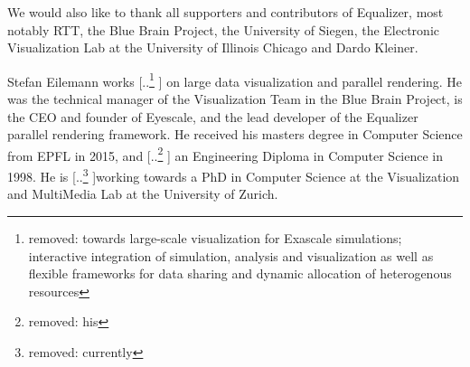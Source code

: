\documentclass[10pt,journal,compsoc]{IEEEtran}
\providecommand{\DIFaddtex}[1]{{\protect\color{blue} \sf #1}} %
\providecommand{\DIFdeltex}[1]{{\protect\color{red} [..\footnote{removed: #1} ]}} %
\providecommand{\DIFaddbegin}{} %
\providecommand{\DIFaddend}{} %
\providecommand{\DIFdelbegin}{} %
\providecommand{\DIFdelend}{} %
\providecommand{\DIFadd}[1]{\texorpdfstring{\DIFaddtex{#1}}{#1}} %
\providecommand{\DIFdel}[1]{\texorpdfstring{\DIFdeltex{#1}}{}} %
\newcommand{\DIFscaledelfig}{0.5}
\newlength{\DIFdelgraphicswidth} %
\newlength{\DIFdelgraphicsheight} %
\newcommand{\DIFaddincludegraphics}[2][]{{\color{blue}\fbox{\DIFOincludegraphics[#1]{#2}}}} %
\newcommand{\DIFdelincludegraphics}[2][]{%
\sbox{\DIFdelgraphicsbox}{\DIFOincludegraphics[#1]{#2}}%
\settoboxwidth{\DIFdelgraphicswidth}{\DIFdelgraphicsbox} %
\settoboxtotalheight{\DIFdelgraphicsheight}{\DIFdelgraphicsbox} %
\scalebox{\DIFscaledelfig}{%
\parbox[b]{\DIFdelgraphicswidth}{\usebox{\DIFdelgraphicsbox}\\[-\baselineskip] \rule{\DIFdelgraphicswidth}{0em}}\llap{\resizebox{\DIFdelgraphicswidth}{\DIFdelgraphicsheight}{%
\setlength{\unitlength}{\DIFdelgraphicswidth}%
\begin{picture}(1,1)%
\thicklines\linethickness{2pt} %
{\color[rgb]{1,0,0}\put(0,0){\framebox(1,1){}}}%
{\color[rgb]{1,0,0}\put(0,0){\line( 1,1){1}}}%
{\color[rgb]{1,0,0}\put(0,1){\line(1,-1){1}}}%
\end{picture}%
}\hspace*{3pt}}} %
} %
\DeclareRobustCommand{\DIFaddbegin}{\DIFOaddbegin \let\includegraphics\DIFaddincludegraphics} %
\DeclareRobustCommand{\DIFaddend}{\DIFOaddend \let\includegraphics\DIFOincludegraphics} %
\DeclareRobustCommand{\DIFdelbegin}{\DIFOdelbegin \let\includegraphics\DIFdelincludegraphics} %
\DeclareRobustCommand{\DIFdelend}{\DIFOaddend \let\includegraphics\DIFOincludegraphics} %
\begin{document}
We would also like to thank all supporters and contributors of
\textsf{Equalizer}, most notably RTT, the Blue Brain Project, the University of
Siegen, the Electronic Visualization Lab at the University of Illinois Chicago
and Dardo Kleiner.


%

\begin{IEEEbiography}{
Stefan Eilemann} works \DIFdelbegin \DIFdel{towards large-scale visualization for Exascale
simulations; interactive integration of simulation, analysis and visualization
as well as flexible frameworks for data sharing and dynamic allocation of
heterogenous resources}\DIFdelend \DIFaddbegin \DIFadd{on large data visualization and parallel rendering}\DIFaddend . He
was the technical manager of the Visualization Team in the Blue Brain Project,
is the CEO and founder of Eyescale, and the lead developer of the
\textsf{Equalizer} parallel rendering framework. He received his masters degree
in Computer Science from EPFL in 2015, and \DIFdelbegin \DIFdel{his }\DIFdelend \DIFaddbegin \DIFadd{an }\DIFaddend Engineering Diploma in Computer
Science in 1998. He is \DIFdelbegin \DIFdel{currently }\DIFdelend working towards a PhD in Computer Science at the
Visualization and MultiMedia Lab at the University of Zurich.
\end{IEEEbiography}
\end{document}
